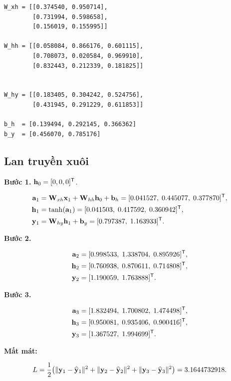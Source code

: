 \begin{verbatim}
W_xh = [[0.374540, 0.950714],
        [0.731994, 0.598658],
        [0.156019, 0.155995]]

W_hh = [[0.058084, 0.866176, 0.601115],
        [0.708073, 0.020584, 0.969910],
        [0.832443, 0.212339, 0.181825]]


W_hy = [[0.183405, 0.304242, 0.524756],
        [0.431945, 0.291229, 0.611853]]

b_h  = [0.139494, 0.292145, 0.366362]
b_y  = [0.456070, 0.785176]
\end{verbatim}

\subsection{ Lan truyền xuôi}

\textbf{Bước 1.} $\mathbf{h}_0 = [0, 0, 0]^{\mathsf{T}}$.

\[
\begin{aligned}
\mathbf{a}_1 &= \mathbf{W}_{xh} \mathbf{x}_1 + \mathbf{W}_{hh} \mathbf{h}_0 + \mathbf{b}_h
           = [0.041527,\; 0.445077,\; 0.377870]^{\mathsf{T}}, \\
\mathbf{h}_1 &= \tanh(\mathbf{a}_1)
           = [0.041503,\; 0.417592,\; 0.360942]^{\mathsf{T}}, \\
\mathbf{y}_1 &= \mathbf{W}_{hy} \mathbf{h}_1 + \mathbf{b}_y
           = [0.797387,\; 1.163933]^{\mathsf{T}}.
\end{aligned}
\]

\textbf{Bước 2.}

\[
\begin{aligned}
\mathbf{a}_2 &= [0.998533,\; 1.338704,\; 0.895926]^{\mathsf{T}}, \\
\mathbf{h}_2 &= [0.760938,\; 0.870611,\; 0.714808]^{\mathsf{T}}, \\
\mathbf{y}_2 &= [1.190059,\; 1.763888]^{\mathsf{T}}.
\end{aligned}
\]

\textbf{Bước 3.}

\[
\begin{aligned}
\mathbf{a}_3 &= [1.832494,\; 1.700802,\; 1.474498]^{\mathsf{T}}, \\
\mathbf{h}_3 &= [0.950081,\; 0.935406,\; 0.900416]^{\mathsf{T}}, \\
\mathbf{y}_3 &= [1.367527,\; 1.994699]^{\mathsf{T}}.
\end{aligned}
\]

\textbf{Mất mát:}

\[
L = \frac{1}{2}\bigl(
    \|\mathbf{y}_1 - \widehat{\mathbf{y}}_1\|^2
  + \|\mathbf{y}_2 - \widehat{\mathbf{y}}_2\|^2
  + \|\mathbf{y}_3 - \widehat{\mathbf{y}}_3\|^2
\bigr) = 3.1644732918.
\]

